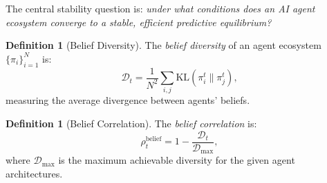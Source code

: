 \documentclass[12pt,a4paper]{article}
\theoremstyle{definition}
\newtheorem{definition}[theorem]{Definition}
\newcommand{\KL}{\mathrm{KL}}
\begin{document}
The central stability question is: \emph{under what conditions does an AI agent ecosystem converge to a stable, efficient predictive equilibrium?}

\begin{definition}[Belief Diversity]\label{def:diversity}
The \emph{belief diversity} of an agent ecosystem $\{\pi_i\}_{i=1}^N$ is:
\begin{equation}
  \mathcal{D}_t = \frac{1}{N^2}\sum_{i,j} \KL(\pi_i^t \| \pi_j^t),
\end{equation}
measuring the average divergence between agents' beliefs.
\end{definition}

\begin{definition}[Belief Correlation]\label{def:belief-corr}
The \emph{belief correlation} is:
\begin{equation}
  \rho_t^{\mathrm{belief}} = 1 - \frac{\mathcal{D}_t}{\mathcal{D}_{\mathrm{max}}},
\end{equation}
where $\mathcal{D}_{\mathrm{max}}$ is the maximum achievable diversity for the given agent architectures.
\end{definition}
\end{document}
